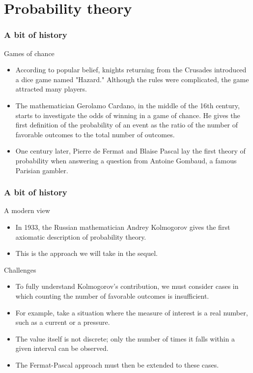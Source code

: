 \section{Probability theory}

\begin{frame}
    \frametitle{A bit of history}
\begin{block}{Games of chance}
    \begin{itemize}
        \item<+-> According to popular belief, knights returning from the Crusades introduced a dice game named "Hazard."
         Although the rules were complicated, the game attracted many players.
        \item<+-> The mathematician Gerolamo Cardano, in the middle of the 16th century, starts to investigate the odds of winning
        in a game of chance. He gives the first definition of the probability of an event as the ratio of
        the number of favorable outcomes to the total number of outcomes.
        \item<+-> One century later, Pierre de Fermat and Blaise Pascal lay the first theory of probability when
        answering a question from Antoine Gombaud, a famous Parisian gambler.
    \end{itemize}
\end{block}
\end{frame}
\begin{frame}
    \frametitle{A bit of history}
\begin{block}{A modern view}
    \begin{itemize}
        \item<+-> In 1933, the Russian mathematician Andrey Kolmogorov gives the first axiomatic description of probability theory.
        \item<+-> This is the approach we will take in the sequel.
    \end{itemize}
\end{block}    
\begin{block}{Challenges}
    \begin{itemize}
       \item<+-> To fully understand Kolmogorov's contribution, we must consider cases in which counting the number of favorable outcomes is insufficient.
       \item<+-> For example, take a situation where the measure of interest is a real number, such as a current or a pressure.
       \item<+-> The value itself is not discrete; only the number of times it falls within a given interval can be observed.
       \item<+-> The Fermat-Pascal approach must then be extended to these cases.
    \end{itemize}
\end{block}    
\end{frame}